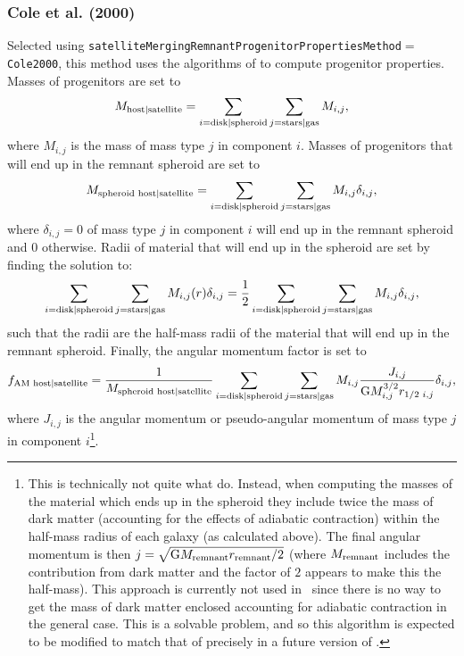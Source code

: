 \subsubsection{Cole et al. (2000)}

Selected using {\tt satelliteMergingRemnantProgenitorPropertiesMethod}$=${\tt Cole2000}, this method uses the algorithms of \cite{cole_hierarchical_2000} to compute progenitor properties. Masses of progenitors are set to
\begin{equation}
 M_{\rm host|satellite} = \sum_{i={\rm disk|spheroid}} \sum_{j={\rm stars|gas}} M_{i,j},
\end{equation}
where $M_{i,j}$ is the mass of mass type $j$ in component $i$. Masses of progenitors that will end up in the remnant spheroid are set to
\begin{equation}
 M_{\rm spheroid\,\,host|satellite} = \sum_{i={\rm disk|spheroid}} \sum_{j={\rm stars|gas}} M_{i,j} \delta_{i,j},
\end{equation}
where $\delta_{i,j}=0$ of mass type $j$ in component $i$ will end up in the remnant spheroid and $0$ otherwise. Radii of material that will end up in the spheroid are set by finding the solution to:
\begin{equation}
\sum_{i={\rm disk|spheroid}} \sum_{j={\rm stars|gas}} M_{i,j}(r) \delta_{i,j} = {1 \over 2} \sum_{i={\rm disk|spheroid}} \sum_{j={\rm stars|gas}} M_{i,j} \delta_{i,j},
\end{equation}
such that the radii are the half-mass radii of the material that will end up in the remnant spheroid. Finally, the angular momentum factor is set to
\begin{equation}
 f_{\rm AM\,\,host|satellite} = {1 \over M_{\rm spheroid\,\,host|satellite}} \sum_{i={\rm disk|spheroid}} \sum_{j={\rm stars|gas}} M_{i,j} {J_{i,j} \over {\rm G} M^{3/2}_{i,j} r_{1/2\,\,i,j}} \delta_{i,j},
\end{equation}
where $J_{i,j}$ is the angular momentum or pseudo-angular momentum of mass type $j$ in component $i$\footnote{This is technically not quite what \protect\cite{cole_hierarchical_2000} do. Instead, when computing the masses of the material which ends up in the spheroid they include twice the mass of dark matter (accounting for the effects of adiabatic contraction) within the half-mass radius of each galaxy (as calculated above). The final angular momentum is then $j=\sqrt{{\rm G} M_{\rm remnant} r_{\rm remnant}/2}$ (where $M_{\rm remnant}$ includes the contribution from dark matter and the factor of $2$ appears to make this the half-mass). This approach is currently not used in \protect\glc\ since there is no way to get the mass of dark matter enclosed accounting for adiabatic contraction in the general case. This is a solvable problem, and so this algorithm is expected to be modified to match that of \protect\cite{cole_hierarchical_2000} precisely in a future version of \protect\glc.}.

